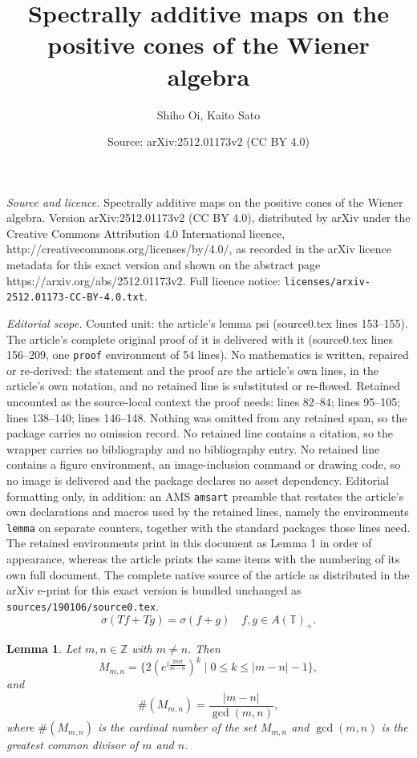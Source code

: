 \documentclass[10pt,a4paper]{amsart}
\title{Spectrally additive maps on the positive cones of the Wiener algebra}
\author{Shiho Oi, Kaito Sato}
\date{Source: arXiv:2512.01173v2 (CC BY 4.0)}
\newtheorem{lemma}{Lemma}
\begin{document}
\maketitle

\noindent\emph{Source and licence.} Spectrally additive maps on the positive cones of the Wiener algebra. Version arXiv:2512.01173v2 (CC BY 4.0), distributed by arXiv under the Creative Commons Attribution 4.0 International licence, http://creativecommons.org/licenses/by/4.0/, as recorded in the arXiv licence metadata for this exact version and shown on the abstract page https://arxiv.org/abs/2512.01173v2. Full licence notice: \texttt{licenses/arxiv-2512.01173-CC-BY-4.0.txt}.\par\smallskip

\noindent\textit{Editorial scope.} Counted unit: the article's lemma psi (source0.tex lines 153--155). The article's complete original proof of it is delivered with it (source0.tex lines 156--209, one \texttt{proof} environment of 54 lines). No mathematics is written, repaired or re-derived: the statement and the proof are the article's own lines, in the article's own notation, and no retained line is substituted or re-flowed.  Retained uncounted as the source-local context the proof needs: lines 82--84; lines 95--105; lines 138--140; lines 146--148.  Nothing was omitted from any retained span, so the package carries no omission record.  No retained line contains a citation, so the wrapper carries no bibliography and no bibliography entry.  No retained line contains a figure environment, an image-inclusion command or drawing code, so no image is delivered and the package declares no asset dependency.  Editorial formatting only, in addition: an AMS \texttt{amsart} preamble that restates the article's own declarations and macros used by the retained lines, namely the environments \texttt{lemma} on separate counters, together with the standard packages those lines need.  The retained environments print in this document as Lemma 1 in order of appearance, whereas the article prints the same items with the numbering of its own full document.  The complete native source of the article as distributed in the arXiv e-print for this exact version is bundled unchanged as \texttt{sources/190106/source0.tex}.
\begin{equation}\label{spectrumadditive}
\sigma(Tf+Tg)=\sigma(f+g) \quad  f, g \in A(\mathbb{T})_{+}.
\end{equation}

\begin{lemma}\label{2}
Let $m,n \in \mathbb{Z}$ with $m \neq n$. Then 
\[
M_{m,n}=\{ 2(e^{i\frac{2m\pi}{m-n}})^k \mid 0 \le k \le |m-n|-1\},
\]
and 
\[
\#(M_{m,n})=\frac{|m-n|}{\operatorname{gcd}(m,n)},
\]
where $\#(M_{m,n})$ is the cardinal number of the set $M_{m,n}$ and $\operatorname{gcd}(m,n)$ is the greatest common divisor of $m$ and $n$.
\end{lemma}
\end{document}
